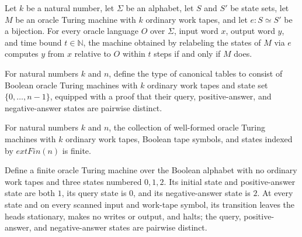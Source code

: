 \begin{theorem}
\label{Turing.OracleTM.relabel_computesInTime}
\leanok
{}
Let $k$ be a natural number, let $\Sigma$ be an alphabet, let $S$ and $S'$ be state
sets, let $M$ be an oracle Turing machine with $k$ ordinary work tapes, and let $e\colon
S\simeq S'$ be a bijection. For every oracle language $O$ over $\Sigma$, input word $x$,
output word $y$, and time bound $t\in\mathbb{N}$, the machine obtained by relabeling the
states of $M$ via $e$ computes $y$ from $x$ relative to $O$ within $t$ steps if and only
if $M$ does.
\end{theorem}

\begin{definition}
\label{Complexity.CanonTab}
\leanok
{}
For natural numbers $k$ and $n$, define the type of canonical tables to consist of
Boolean oracle Turing machines with $k$ ordinary work tapes and state set
$\{0,\ldots,n-1\}$, equipped with a proof that their query, positive-answer, and
negative-answer states are pairwise distinct.
\end{definition}

\begin{definition}
\label{Complexity.canonTabFintype}
\leanok
{}
For natural numbers $k$ and $n$, the collection of well-formed oracle Turing machines
with $k$ ordinary work tapes, Boolean tape symbols, and states indexed by $	ext{Fin}(n)$
is finite.
\end{definition}

\begin{definition}
\label{Complexity.oracleDefault}
\leanok
{}
Define a finite oracle Turing machine over the Boolean alphabet with no ordinary work
tapes and three states numbered $0,1,2$. Its initial state and positive-answer state are
both $1$, its query state is $0$, and its negative-answer state is $2$. At every state
and on every scanned input and work-tape symbol, its transition leaves the heads
stationary, makes no writes or output, and halts; the query, positive-answer, and
negative-answer states are pairwise distinct.
\end{definition}

